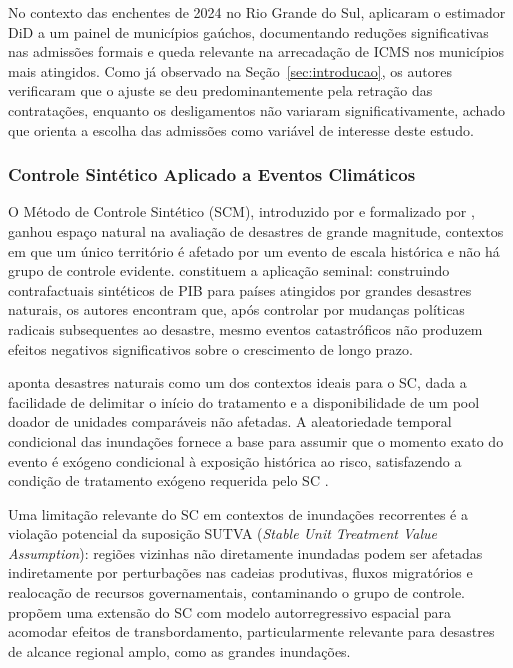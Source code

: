 \documentclass[a4paper,12pt]{article}
\begin{document}
No contexto das enchentes de 2024 no Rio Grande do Sul, 
aplicaram o estimador DiD a um painel de municípios gaúchos, documentando reduções
significativas nas admissões formais e queda relevante na arrecadação de ICMS nos
municípios mais atingidos. Como já observado na Seção~\ref{sec:introducao}, os autores
verificaram que o ajuste se deu predominantemente pela retração das contratações,
enquanto os desligamentos não variaram significativamente, achado que orienta a
escolha das admissões como variável de interesse deste estudo.

\subsubsection{Controle Sintético Aplicado a Eventos Climáticos}

O Método de Controle Sintético (SCM), introduzido por  e
formalizado por , ganhou espaço natural na avaliação
de desastres de grande magnitude, contextos em que um único território é afetado por
um evento de escala histórica e não há grupo de controle evidente. 
constituem a aplicação seminal: construindo contrafactuais sintéticos de PIB para países
atingidos por grandes desastres naturais, os autores encontram que, após controlar por
mudanças políticas radicais subsequentes ao desastre, mesmo eventos catastróficos não
produzem efeitos negativos significativos sobre o crescimento de longo prazo.

 aponta desastres naturais como um dos contextos ideais para o
SC, dada a facilidade de delimitar o início do tratamento e a disponibilidade de um
pool doador de unidades comparáveis não afetadas. A aleatoriedade temporal condicional
das inundações fornece a base para assumir que o momento exato do evento é exógeno
condicional à exposição histórica ao risco, satisfazendo a condição de tratamento
exógeno requerida pelo SC \cite{elsner2024}.

Uma limitação relevante do SC em contextos de inundações recorrentes é a violação
potencial da suposição SUTVA (\textit{Stable Unit Treatment Value Assumption}): regiões
vizinhas não diretamente inundadas podem ser afetadas indiretamente por perturbações nas
cadeias produtivas, fluxos migratórios e realocação de recursos governamentais,
contaminando o grupo de controle.  propõem uma extensão do
SC com modelo autorregressivo espacial para acomodar efeitos de transbordamento,
particularmente relevante para desastres de alcance regional amplo,
como as grandes inundações.
\end{document}
